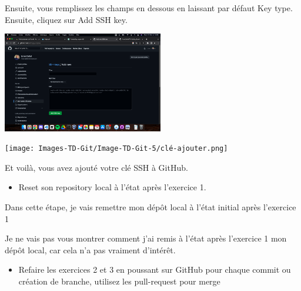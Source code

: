 \documentclass[12pt]{article}
\begin{document}
\vspace{0.3cm}

Ensuite, vous remplissez les champs en dessous en laissant par défaut Key type. Ensuite, cliquez sur Add SSH key.

\vspace{0.3cm}

\begin{center}
  \includegraphics[width=7cm]{Images-TD-Git/Image-TD-Git-5/ssh-key.png}
\end{center}

\vspace{0.3cm}

\begin{center}
  \texttt{[image: Images-TD-Git/Image-TD-Git-5/clé-ajouter.png]}
\end{center}

\vspace{0.3cm}

Et voilà, vous avez ajouté votre clé SSH à GitHub.

\vspace{0.3cm}

\begin{itemize}
  \item Reset son repository local à l'état après l'exercice 1.
\end{itemize}

\vspace{0.3cm}

Dans cette étape, je vais remettre mon dépôt local à l'état initial après l'exercice 1

Je ne vais pas vous montrer comment j'ai remis à l'état après l'exercice 1 mon dépôt local, car cela n'a pas vraiment d'intérêt.

\vspace{0.3cm}

\begin{itemize}
  \item Refaire les exercices 2 et 3 en poussant sur GitHub pour chaque commit ou création de branche, utilisez les pull-request pour merge
\end{itemize}
\end{document}
